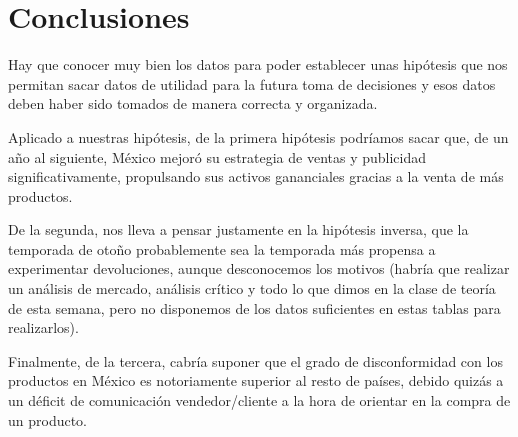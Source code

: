 \documentclass{article}
\begin{document}
\section{Conclusiones}

Hay que conocer muy bien los datos para poder establecer unas hipótesis que nos permitan sacar datos de utilidad para la futura toma de decisiones y esos datos deben haber sido tomados de manera correcta y organizada.

Aplicado a nuestras hipótesis, de la primera hipótesis podríamos sacar que, de un año al siguiente, México mejoró su estrategia de ventas y publicidad significativamente, propulsando sus activos gananciales gracias a la venta de más productos.

De la segunda, nos lleva a pensar justamente en la hipótesis inversa, que la temporada de otoño probablemente sea la temporada más propensa a experimentar devoluciones, aunque desconocemos los motivos (habría que realizar un análisis de mercado, análisis crítico y todo lo que dimos en la clase de teoría de esta semana, pero no disponemos de los datos suficientes en estas tablas para realizarlos).

Finalmente, de la tercera, cabría suponer que el grado de disconformidad con los productos en México es notoriamente superior al resto de países, debido quizás a un déficit de comunicación vendedor/cliente a la hora de orientar en la compra de un producto.

\begin{thebibliography}{9}

\end{thebibliography}
\end{document}

